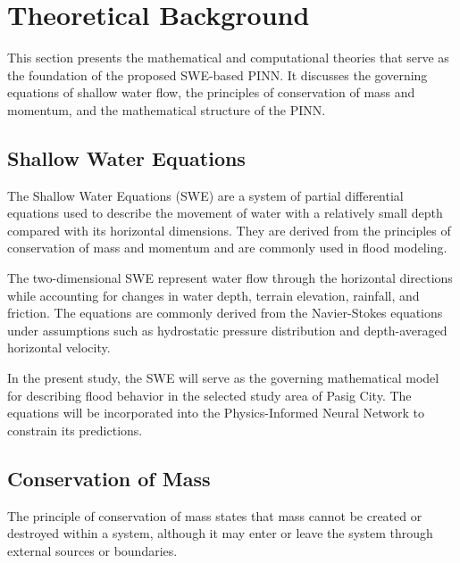 \section{Theoretical Background}


This section presents the mathematical and computational theories that serve as the foundation of the proposed SWE-based PINN. It discusses the governing equations of shallow water flow, the principles of conservation of mass and momentum, and the mathematical structure of the PINN.

\subsection{Shallow Water Equations}


The Shallow Water Equations (SWE) are a system of partial differential equations used to describe the movement of water with a relatively small depth compared with its horizontal dimensions. They are derived from the principles of conservation of mass and momentum and are commonly used in flood modeling.

The two-dimensional SWE represent water flow through the horizontal directions while accounting for changes in water depth, terrain elevation, rainfall, and friction. The equations are commonly derived from the Navier-Stokes equations under assumptions such as hydrostatic pressure distribution and depth-averaged horizontal velocity.

In the present study, the SWE will serve as the governing mathematical model for describing flood behavior in the selected study area of Pasig City. The equations will be incorporated into the Physics-Informed Neural Network to constrain its predictions.

\subsection{Conservation of Mass}


The principle of conservation of mass states that mass cannot be created or destroyed within a system, although it may enter or leave the system through external sources or boundaries.

